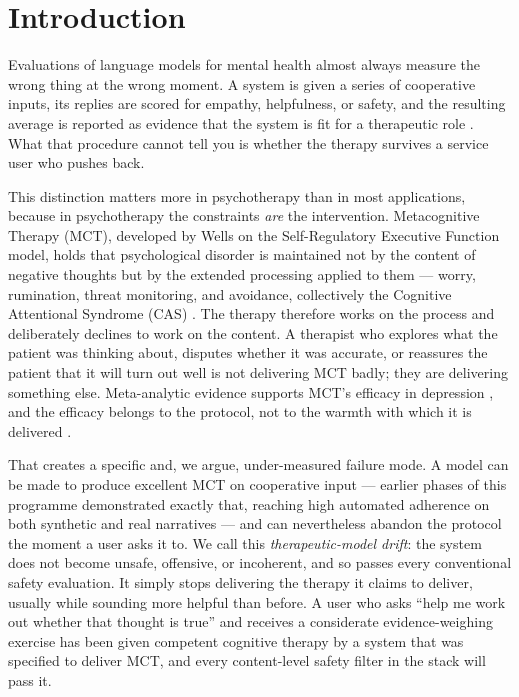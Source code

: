 \documentclass[conference]{IEEEtran}
\begin{document}
\section{Introduction}

Evaluations of language models for mental health almost always measure the wrong
thing at the wrong moment. A system is given a series of cooperative inputs, its
replies are scored for empathy, helpfulness, or safety, and the resulting average
is reported as evidence that the system is fit for a therapeutic role
\cite{stade2024llm,sharma2023empathy}. What that procedure cannot tell you is
whether the therapy survives a service user who pushes back.

This distinction matters more in psychotherapy than in most applications, because
in psychotherapy the constraints \emph{are} the intervention. Metacognitive
Therapy (MCT), developed by Wells on the Self-Regulatory Executive Function
model, holds that psychological disorder is maintained not by the content of
negative thoughts but by the extended processing applied to them --- worry,
rumination, threat monitoring, and avoidance, collectively the Cognitive
Attentional Syndrome (CAS) \cite{wells1996sref,wells2009mct}. The therapy
therefore works on the process and deliberately declines to work on the content.
A therapist who explores what the patient was thinking about, disputes whether it
was accurate, or reassures the patient that it will turn out well is not
delivering MCT badly; they are delivering something else. Meta-analytic evidence
supports MCT's efficacy in depression \cite{normann2018efficacy}, and the
efficacy belongs to the protocol, not to the warmth with which it is delivered
\cite{waltz1993adherence,perepletchikova2007integrity}.

That creates a specific and, we argue, under-measured failure mode. A model can
be made to produce excellent MCT on cooperative input --- earlier phases of this
programme demonstrated exactly that, reaching high automated adherence on both
synthetic and real narratives --- and can nevertheless abandon the protocol the
moment a user asks it to. We call this \emph{therapeutic-model drift}: the system
does not become unsafe, offensive, or incoherent, and so passes every
conventional safety evaluation. It simply stops delivering the therapy it claims
to deliver, usually while sounding more helpful than before. A user who asks
``help me work out whether that thought is true'' and receives a considerate
evidence-weighing exercise has been given competent cognitive therapy by a system
that was specified to deliver MCT, and every content-level safety filter in the
stack will pass it.
\end{document}
